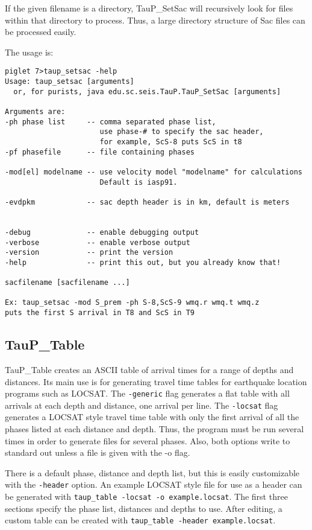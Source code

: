 If the given filename is a directory, TauP\_SetSac will recursively look for files within that directory to process. Thus,
a large directory structure of Sac files can be processed easily.

The usage is:
\begin{verbatim}
piglet 7>taup_setsac -help
Usage: taup_setsac [arguments]
  or, for purists, java edu.sc.seis.TauP.TauP_SetSac [arguments]

Arguments are:
-ph phase list     -- comma separated phase list,
                      use phase-# to specify the sac header,
                      for example, ScS-8 puts ScS in t8
-pf phasefile      -- file containing phases

-mod[el] modelname -- use velocity model "modelname" for calculations
                      Default is iasp91.

-evdpkm            -- sac depth header is in km, default is meters


-debug             -- enable debugging output
-verbose           -- enable verbose output
-version           -- print the version
-help              -- print this out, but you already know that!

sacfilename [sacfilename ...]

Ex: taup_setsac -mod S_prem -ph S-8,ScS-9 wmq.r wmq.t wmq.z
puts the first S arrival in T8 and ScS in T9
\end{verbatim} 

\subsection{TauP\_Table}

TauP\_Table creates an ASCII table of arrival times for a range of depths and
distances. Its main use is for generating travel time tables for earthquake
location programs such as LOCSAT. The \texttt{-generic} flag generates a flat
table with all arrivals at each depth and distance, one arrival per line.
The \texttt{-locsat} flag generates a LOCSAT style travel time table with
only the first arrival of all the phases listed at each distance and depth.
Thus, the program must be run several times in order to generate files for 
several phases. Also, both options write to standard out unless a file is
given with the -o flag.

There is a default phase, distance and depth list, but this is easily 
customizable with the \texttt{-header} option. An example LOCSAT style 
file for use as a header can be generated with 
\texttt{taup\_table -locsat -o example.locsat}. The first 
three sections specify the phase list, distances and depths to use. 
After editing, a custom table can be created with 
\texttt{taup\_table -header example.locsat}.

